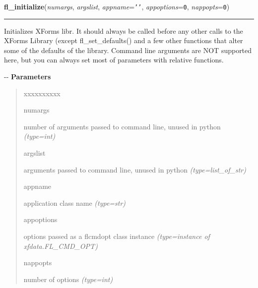 \hspace{.8\funcindent}\begin{boxedminipage}{\funcwidth}

    \raggedright \textbf{fl\_initialize}(\textit{numargs}, \textit{argslist}, \textit{appname}={\tt \texttt{'}\texttt{}\texttt{'}}, \textit{appoptions}={\tt 0}, \textit{nappopts}={\tt 0})

    \vspace{-1.5ex}

    \rule{\textwidth}{0.5\fboxrule}
\setlength{\parskip}{2ex}

Initializes XForms libr. It should always be called before any
other calls to the XForms Library (except fl\_set\_defaults() and a few
other functions that alter some of the defaults of the library.
Command line arguments are NOT supported here, but you can always set
most of parameters with relative functions.

-{}-
\setlength{\parskip}{1ex}
      \textbf{Parameters}
      \vspace{-1ex}

      \begin{quote}
        \begin{Ventry}{xxxxxxxxxx}

          \item[numargs]


number of arguments passed to command line, unused in python
            {\it (type=int)}

          \item[argslist]


arguments passed to command line, unused in python
            {\it (type=list\_of\_str)}

          \item[appname]


application class name
            {\it (type=str)}

          \item[appoptions]


options passed as a flcmdopt class instance
            {\it (type=instance of xfdata.FL\_CMD\_OPT)}

          \item[nappopts]


number of options
            {\it (type=int)}

        \end{Ventry}

      \end{quote}


\end{boxedminipage}
